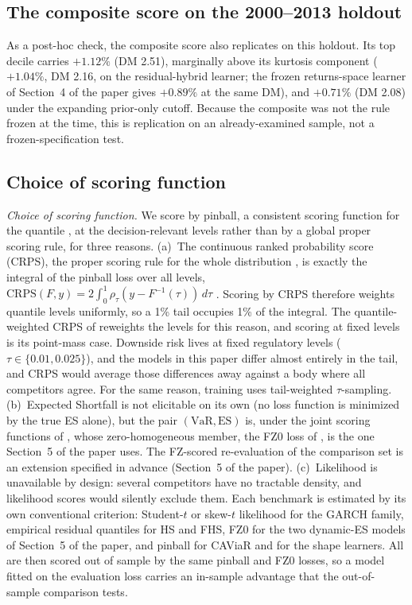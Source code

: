 \documentclass[11pt]{article}
\newcommand{\VaR}{\mathrm{VaR}}
\newcommand{\ES}{\mathrm{ES}}
\begin{document}
\subsection*{The composite score on the 2000--2013 holdout}
As
a post-hoc check, the composite score also replicates on this holdout.
Its top decile carries $+1.12\%$ (DM 2.51), marginally above its kurtosis
component ($+1.04\%$, DM 2.16, on the residual-hybrid learner; the frozen returns-space learner of Section~4 of the paper gives $+0.89\%$ at the same DM), and $+0.71\%$ (DM 2.08) under the
expanding prior-only cutoff. Because the composite was not the rule frozen at the time, this is replication on an already-examined sample, not a frozen-specification test.

\subsection*{Choice of scoring function}
\emph{Choice of scoring function.} We score by pinball, a consistent scoring function for the quantile \citep{gneiting2011}, at the decision-relevant levels rather than by a global proper scoring rule, for three reasons. (a)~The continuous ranked probability
score (CRPS), the proper scoring rule for the whole distribution \citep{gneitingraftery2007}, is exactly the integral of the pinball loss over all
levels, $\mathrm{CRPS}(F,y) = 2\int_0^1 \rho_\tau(y - F^{-1}(\tau))\,
d\tau$ \citep{gneitingranjan2011}. Scoring by CRPS therefore weights
quantile levels uniformly, so a 1\% tail occupies 1\% of the
integral. The quantile-weighted CRPS of \citet{gneitingranjan2011} reweights the levels for this reason, and scoring at fixed levels is its point-mass case. Downside
risk lives at fixed regulatory levels ($\tau \in \{0.01, 0.025\}$), and
the models in this paper differ almost entirely in the tail, and CRPS
would average those differences away against a body where all
competitors agree. For the same reason, training uses tail-weighted $\tau$-sampling. (b)~Expected Shortfall is not elicitable
on its own \citep{gneiting2011} (no loss function is minimized by the true ES alone), but
the pair $(\VaR,\ES)$ is, under the joint scoring functions of
\citet{fissler2016}, whose zero-homogeneous member, the FZ0 loss of \citet{patton2019}, is the one Section~5 of the paper uses. The FZ-scored re-evaluation of the comparison set is an extension specified in advance (Section~5 of the paper). (c)~Likelihood is
unavailable by design: several competitors have no tractable density, and likelihood scores
would silently exclude them. Each benchmark is estimated by its own conventional criterion: Student-$t$ or skew-$t$ likelihood for the GARCH family, empirical residual quantiles for HS and FHS, FZ0 for the two dynamic-ES models of Section~5 of the paper, and pinball for CAViaR and for the shape learners. All are then scored out of sample by the same pinball and FZ0 losses, so a model fitted on the evaluation loss carries an in-sample advantage that the out-of-sample comparison tests.
\end{document}
